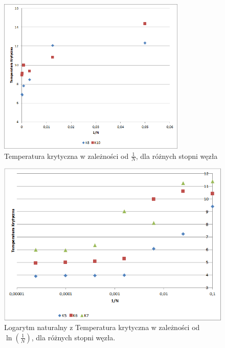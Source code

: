 \documentclass[12pt,a4paper]{article}
\begin{document}
\begin{figure}
\includegraphics[width=0.8\textwidth]{K8K10.png}
\caption{Temperatura krytyczna w zależności od $\frac{1}{N}$, dla różnych stopni węzła}
\label{fig:TcOd1/N.2}
\end{figure}

\begin{figure}
\includegraphics[width=\textwidth]{LNK5K6K7.png}
\caption{Logarytm naturalny z Temperatura krytyczna w zależności od $\ln(\frac{1}{N})$, dla różnych stopni węzła.}
\label{fig:LnTcOd1/N.1}
\end{figure}
\end{document}
